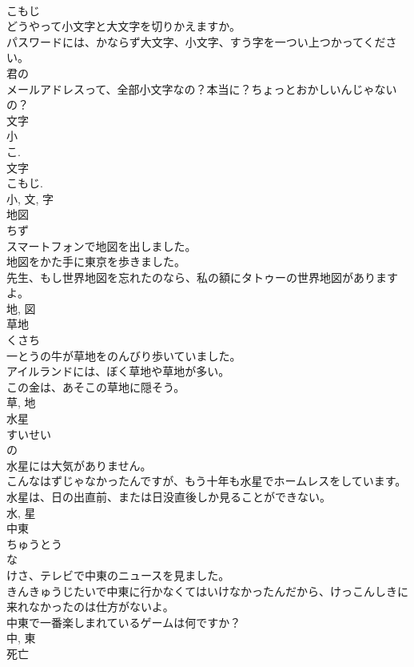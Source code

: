 \documentclass[8pt]{extreport}
\begin{document}
\begin{CJK}{UTF8}{min}
\\	こもじ	
\\	どうやって小文字と大文字を切りかえますか。	
\\	パスワードには、かならず大文字、小文字、すう字を一つい上つかってください。	
\\	君の
\\	メールアドレスって、全部小文字なの？本当に？ちょっとおかしいんじゃないの？	
\\	文字 
\\	小 
\\	こ. 
\\	文字 
\\	こもじ.
\\	小, 文, 字	
\\	地図	
\\	ちず	
\\	スマートフォンで地図を出しました。	
\\	地図をかた手に東京を歩きました。	
\\	先生、もし世界地図を忘れたのなら、私の額にタトゥーの世界地図がありますよ。	
\\	地, 図	
\\	草地	
\\	くさち	
\\	一とうの牛が草地をのんびり歩いていました。	
\\	アイルランドには、ぼく草地や草地が多い。	
\\	この金は、あそこの草地に隠そう。	
\\	草, 地	
\\	水星	
\\	すいせい	
\\	の 
\\	水星には大気がありません。	
\\	こんなはずじゃなかったんですが、もう十年も水星でホームレスをしています。	
\\	水星は、日の出直前、または日没直後しか見ることができない。	
\\	水, 星	
\\	中東	
\\	ちゅうとう	
\\	な 
\\	けさ、テレビで中東のニュースを見ました。	
\\	きんきゅうじたいで中東に行かなくてはいけなかったんだから、けっこんしきに来れなかったのは仕方がないよ。	
\\	中東で一番楽しまれているゲームは何ですか？	
\\	中, 東	
\\	死亡	

\end{CJK}
\end{document}
